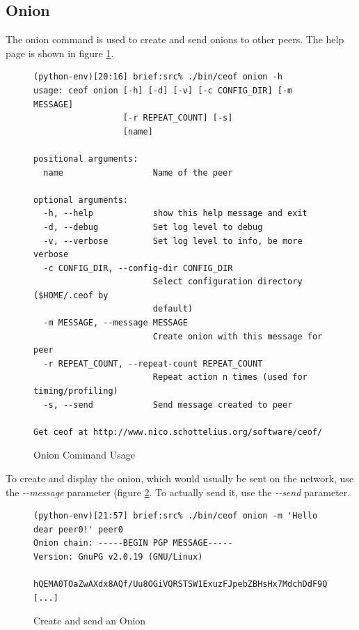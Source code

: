 \subsection{Onion}
The onion command is used to create and send onions to other peers.
The help page is shown in figure \ref{onionusage}.
\begin{figure}[htbp]
\caption{Onion Command Usage}
\label{onionusage}
\begin{verbatim}
(python-env)[20:16] brief:src% ./bin/ceof onion -h        
usage: ceof onion [-h] [-d] [-v] [-c CONFIG_DIR] [-m MESSAGE]
                  [-r REPEAT_COUNT] [-s]
                  [name]

positional arguments:
  name                  Name of the peer

optional arguments:
  -h, --help            show this help message and exit
  -d, --debug           Set log level to debug
  -v, --verbose         Set log level to info, be more verbose
  -c CONFIG_DIR, --config-dir CONFIG_DIR
                        Select configuration directory ($HOME/.ceof by
                        default)
  -m MESSAGE, --message MESSAGE
                        Create onion with this message for peer
  -r REPEAT_COUNT, --repeat-count REPEAT_COUNT
                        Repeat action n times (used for timing/profiling)
  -s, --send            Send message created to peer

Get ceof at http://www.nico.schottelius.org/software/ceof/
\end{verbatim}
\end{figure}
To create and display the onion, which would usually be sent on the network,
use the \textit{-{}-message} parameter (figure \ref{onioncreate}. 
To actually send it, use the \textit{-{}-send} parameter.
\begin{figure}[htbp]
\caption{Create and send an Onion}
\label{onioncreate}
\begin{verbatim}
(python-env)[21:57] brief:src% ./bin/ceof onion -m 'Hello dear peer0!' peer0
Onion chain: -----BEGIN PGP MESSAGE-----
Version: GnuPG v2.0.19 (GNU/Linux)

hQEMA0TOaZwAXdx8AQf/Uu8OGiVQRSTSW1ExuzFJpebZBHsHx7MdchDdF9QlfW1V
[...]
\end{verbatim}
\end{figure}
